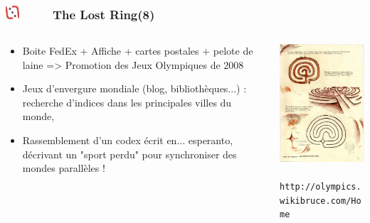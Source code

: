 \documentclass[slidetop,11pt]{beamer}
\def\sectionPartIIaIV{The Lost Ring}
\def\moreInFrameTitleLeftt{\includegraphics[height=0.5cm]{img/ligueludique-0.png}~~~~~}
\begin{document}
\begin{frame}
	\frametitle{\moreInFrameTitleLeftt \sectionPartIIaIV  (8) }
	\begin{columns}[T]
		\begin{column}[T]{5.05cm}
			\begin{itemize}
				\item Boite FedEx + Affiche + cartes postales + pelote de laine => Promotion des Jeux Olympiques de 2008
				\item Jeux d'envergure mondiale (blog, biblioth{\`e}ques...) : recherche d'indices dans les principales villes du monde, 
				\item Rassemblement d'un codex {\'e}crit en... esperanto, d{\'e}crivant un "sport perdu" pour synchroniser des mondes parall{\`e}les !
			\end{itemize}
		\end{column}
		\begin{column}[T]{5.05cm}
			\includegraphics[width=5.00cm]{img/argTheLostRing/430px-CotLR-4Ap2.jpg}~\\
			\texttt{\footnotesize http://olympics.wikibruce.com/Home}
		\end{column}
	\end{columns}
\end{frame}
\end{document}
